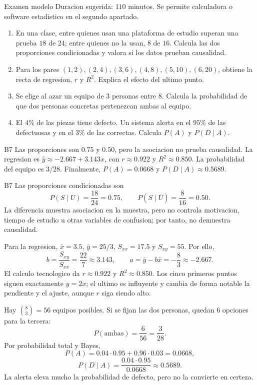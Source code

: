 \begin{exambrief}{Examen modelo}
Duracion sugerida: \(110\) minutos. Se permite calculadora o software estadistico en el segundo
apartado.
\begin{enumerate}
  \item En una clase, entre quienes usan una plataforma de estudio superan una prueba \(18\) de
  \(24\); entre quienes no la usan, \(8\) de \(16\). Calcula las dos proporciones condicionadas
  y valora si los datos prueban causalidad.
  \item Para los pares \((1,2),(2,4),(3,6),(4,8),(5,10),(6,20)\), obtiene la recta de regresion,
  \(r\) y \(R^2\). Explica el efecto del ultimo punto.
  \item Se elige al azar un equipo de \(3\) personas entre \(8\). Calcula la probabilidad de que
  dos personas concretas pertenezcan ambas al equipo.
  \item El \(4\%\) de las piezas tiene defecto. Un sistema alerta en el \(95\%\) de las
  defectuosas y en el \(3\%\) de las correctas. Calcula \(P(A)\) y \(P(D\mid A)\).
\end{enumerate}
\end{exambrief}

\begin{shortanswer}{B7}
Las proporciones son \(0.75\) y \(0.50\), pero la asociacion no prueba causalidad. La regresion
es \(\hat y\approx-2.667+3.143x\), con \(r\approx0.922\) y \(R^2\approx0.850\). La probabilidad
del equipo es \(3/28\). Finalmente, \(P(A)=0.0668\) y \(P(D\mid A)\approx0.5689\).
\end{shortanswer}

\begin{fullsolution}{B7}
Las proporciones condicionadas son
\[
P(S\mid U)=\frac{18}{24}=0.75,
\qquad
P(S\mid\overline U)=\frac8{16}=0.50.
\]
La diferencia muestra asociacion en la muestra, pero no controla motivacion, tiempo de estudio u
otras variables de confusion; por tanto, no demuestra causalidad.

Para la regresion, \(\bar x=3.5\), \(\bar y=25/3\),
\(S_{xx}=17.5\) y \(S_{xy}=55\). Por ello,
\[
b=\frac{S_{xy}}{S_{xx}}=\frac{22}{7}\approx3.143,
\qquad
a=\bar y-b\bar x=-\frac83\approx-2.667.
\]
El calculo tecnologico da \(r\approx0.922\) y \(R^2\approx0.850\). Los cinco primeros puntos
siguen exactamente \(y=2x\); el ultimo es influyente y cambia de forma notable la pendiente y el
ajuste, aunque \(r\) siga siendo alto.

Hay \(\binom83=56\) equipos posibles. Si se fijan las dos personas, quedan \(6\) opciones para
la tercera:
\[
P(\text{ambas})=\frac6{56}=\frac3{28}.
\]
Por probabilidad total y Bayes,
\[
P(A)=0.04\cdot0.95+0.96\cdot0.03=0.0668,
\]
\[
P(D\mid A)=\frac{0.04\cdot0.95}{0.0668}\approx0.5689.
\]
La alerta eleva mucho la probabilidad de defecto, pero no la convierte en certeza.
\end{fullsolution}

